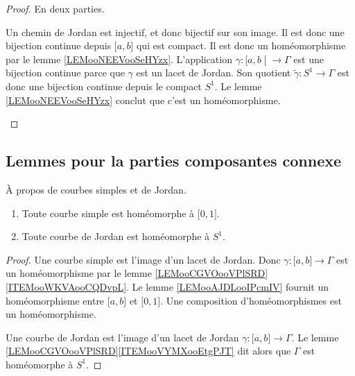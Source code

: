 \begin{proof}
	En deux parties.
	\begin{subproof}
		Un chemin de Jordan est injectif, et donc bijectif sur son image. Il est donc une bijection continue depuis \( \mathopen[ a , b \mathclose]\) qui est compact. Il est donc un homéomorphisme par le lemme \ref{LEMooNEEVooSeHYzx}.
		L'application \( \gamma\colon \mathopen[ a , b \mathclose[\to \Gamma \) est une bijection continue parce que \( \gamma\) est un lacet de Jordan. Son quotient \( \tilde \gamma\colon S^1\to \Gamma\) est donc une bijection continue depuis le compact \( S^1\). Le lemme \ref{LEMooNEEVooSeHYzx} conclut que c'est un homéomorphisme.
	\end{subproof}
\end{proof}

\subsection{Lemmes pour la parties composantes connexe}


\begin{corollary}		\label{CORooPGFLooUTVZMi}
	À propos de courbes simples et de Jordan.
	\begin{enumerate}
		\item
		      Toute courbe simple est homéomorphe à \( \mathopen[ 0 , 1 \mathclose]\).
		\item		\label{ITEMooIUAXooOfvNov}
		      Toute courbe de Jordan est homéomorphe à \( S^1\).
	\end{enumerate}
\end{corollary}

\begin{proof}
	Une courbe simple est l'image d'un lacet de Jordan. Donc \( \gamma\colon \mathopen[ a , b \mathclose]\to \Gamma\) est un homéomorphisme par le lemme \ref{LEMooCGVOooVPlSRD}\ref{ITEMooWKVAooCQDvpL}. Le lemme \ref{LEMooAJDLooIPcmIV} fournit un homéomorphisme entre \( \mathopen[ a , b \mathclose]\) et \( \mathopen[ 0 , 1 \mathclose]\). Une composition d'homéomorphismes est un homéomorphisme.

	Une courbe de Jordan est l'image d'un lacet de Jordan \( \gamma\colon \mathopen[ a , b \mathclose]\to \Gamma\). Le lemme \ref{LEMooCGVOooVPlSRD}\ref{ITEMooVYMXooEtgPJT} dit alors que \( \Gamma\) est homéomorphe à \( S^1\).
\end{proof}


